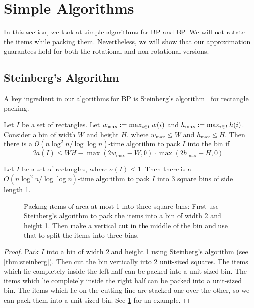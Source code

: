 \section{Simple Algorithms}
\label{sec:simple-algos}

In this section, we look at simple algorithms for  BP
and  BP.
We will not rotate the items while packing them.
Nevertheless, we will show that our approximation guarantees
hold for both the rotational and non-rotational versions.

\subsection{Steinberg's Algorithm}

A key ingredient in our algorithms for  BP is
Steinberg's algorithm~\cite{steinberg1997strip} for rectangle packing.

\begin{lemma}
\label{thm:steinberg}
Let $I$ be a set of rectangles. Let $w_{\max} := \max_{i \in I} w(i)$
and $h_{\max} := \max_{i \in I} h(i)$. Consider a bin of width $W$ and height $H$,
where $w_{\max} \le W$ and $h_{\max} \le H$.
Then there is a $O(n\log^2 n/\log\log n)$-time algorithm to pack $I$ into the bin if
\[ 2a(I) \le WH - \max(2w_{\max} - W, 0) \cdot \max(2h_{\max} - H, 0) \]
\end{lemma}

\begin{lemma}
\label{corr:steinberg}
Let $I$ be a set of rectangles, where $a(I) \le 1$.
Then there is a $O(n\log^2 n/\log\log n)$-time algorithm to pack $I$ into
3 square bins of side length 1.
\end{lemma}

\begin{figure}[htb]
\centering

\caption[Packing items of area at most 1 into three bins using Steinberg's algorithm.]%
{Packing items of area at most 1 into three square bins:
First use Steinberg's algorithm to pack the items into a bin of width 2 and height 1.
Then make a vertical cut in the middle of the bin
and use that to split the items into three bins.}
\label{fig:steinberg}
\end{figure}

\begin{proof}
Pack $I$ into a bin of width 2 and height 1 using Steinberg's algorithm
(see \cref{thm:steinberg}).
Then cut the bin vertically into 2 unit-sized squares.
The items which lie completely inside the left half can be packed into a unit-sized bin.
The items which lie completely inside the right half can be packed into a unit-sized bin.
The items which lie on the cutting line are stacked one-over-the-other,
so we can pack them into a unit-sized bin.
See \cref{fig:steinberg} for an example.
\end{proof}

